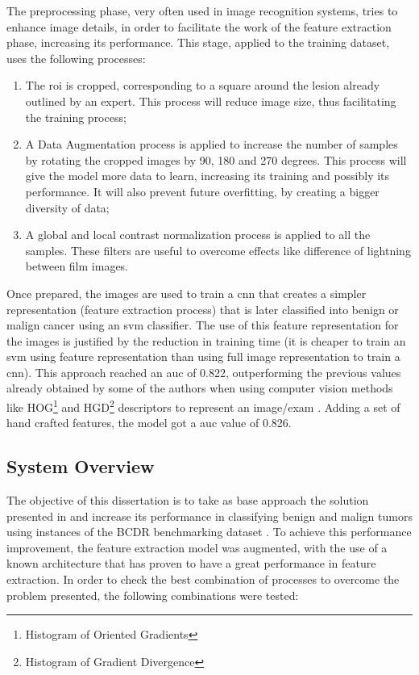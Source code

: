 \documentclass[
  twoside,
  11pt, a4paper,
  footinclude=true,
  headinclude=true,
  cleardoublepage=empty
]{scrbook}
\begin{document}
        The preprocessing phase, very often used in image recognition systems, tries to enhance image details, in order to facilitate the work of the feature extraction phase, increasing its performance. This stage, applied to the training dataset, uses the following processes:

        \begin{enumerate}
          \item The \gls{roi} is cropped, corresponding to a square around the lesion already outlined by an expert. This process will reduce image size, thus facilitating the training process;
          \item A Data Augmentation process is applied to increase the number of samples by rotating the cropped images by 90, 180 and 270 degrees. This process will give the model more data to learn, increasing its training and possibly its performance. It will also prevent future overfitting, by creating a bigger diversity of data;
          \item A global and local contrast normalization process is applied to all the samples. These filters are useful to overcome effects like difference of lightning between film images.
        \end{enumerate}

        Once prepared, the images are used to train a \gls{cnn} that creates a simpler representation (feature extraction process) that is later classified into benign or malign cancer using an \gls{svm} classifier. The use of this feature representation for the images is justified by the reduction in training time (it is cheaper to train an \gls{svm} using feature representation than using full image representation to train a \gls{cnn}). This approach reached an \gls{auc} of 0.822, outperforming the previous values already obtained by some of the authors when using computer vision methods like HOG\footnote{Histogram of Oriented Gradients} and HGD\footnote{Histogram of Gradient Divergence} descriptors to represent an image/exam \cite{moura2013evaluation}. Adding a set of hand crafted features, the model got a \gls{auc} value of 0.826.

      \subsection{System Overview} \label{problem:proposal:architecture}
        The objective of this dissertation is to take as base approach the solution presented in \cite{arevalo2016representation} and increase its performance in classifying benign and malign tumors using instances of the BCDR benchmarking dataset \cite{lopez2012bcdr}. To achieve this performance improvement, the feature extraction model was augmented, with the use of a known architecture that has proven to have a great performance in feature extraction. In order to check the best combination of processes to overcome the problem presented, the following combinations were tested:
\end{document}
